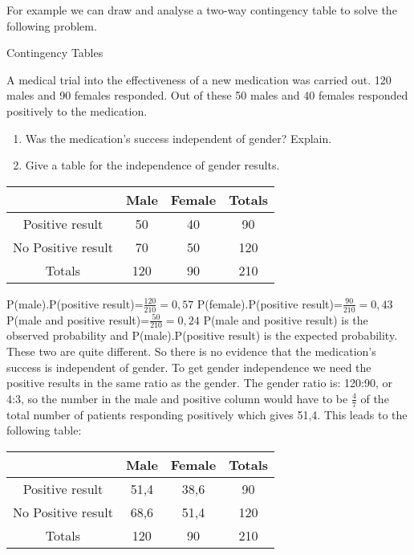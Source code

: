 
For example we can draw and analyse a two-way contingency table to solve the following problem.
\begin{wex}{Contingency Tables}
{A medical trial into the effectiveness of a new medication was carried out. 120 males and 90 females responded. Out of these 50 males and 40 females responded positively to the medication. 
\begin{enumerate}
\item Was the medication's success independent of gender? Explain.
\item Give a table for the independence of gender results.
\end{enumerate}}
{
\begin{center}
\begin{tabular}{|c|c|c|c|}
\hline
                   & Male & Female & Totals \\
\hline
Positive result    & 50   & 40     & 90     \\
No Positive result & 70   & 50     & 120    \\
\hline
Totals             & 120  & 90     & 210    \\
\hline
\end{tabular}
\end{center}
P(male).P(positive result)=$\frac{120}{210}=0,57$ \newline
P(female).P(positive result)=$\frac{90}{210}=0,43$ \newline
P(male and positive result)=$\frac{50}{210}=0,24$
P(male and positive result) is the observed probability and P(male).P(positive result) is the expected probability. These two are quite different. So there is no evidence that the medication's success is independent of gender.
To get gender independence we need the positive results in the same ratio as the gender. The gender ratio is: 120:90, or 4:3, so the number in the male and positive column would have to be $\frac{4}{7}$ of the total number of patients responding positively which gives 51,4. This leads to the following table:
\begin{center}
\begin{tabular}{|c|c|c|c|}
\hline
                   & Male & Female & Totals \\
\hline
Positive result    & 51,4   & 38,6     & 90     \\
No Positive result & 68,6   & 51,4     & 120    \\
\hline
Totals             & 120  & 90     & 210    \\
\hline
\end{tabular}
\end{center}
}
\end{wex}

